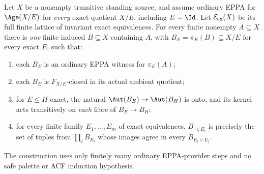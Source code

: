 \begin{theorem}
\label{thm:acf-owner-master}
Let \(X\) be a nonempty transitive standing
source, and assume ordinary EPPA for \(\Age(X/E)\) for
\emph{every} exact quotient \(X/E\), including \(E=\Id\).
Let
\(\mathcal E_{\rm ex}(X)\) be its full finite
lattice of invariant exact equivalences.
For every finite nonempty \(A\subseteq X\)
there is \emph{one} finite induced \(B\subseteq X\)
containing \(A\), with
\(B_E=\pi_E(B)\subseteq X/E\) for every exact \(E\),
such that:
\begin{enumerate}
\item[(M1)] each \(B_E\) is an ordinary EPPA
  witness for \(\pi_E(A)\);
\item[(M2)] each \(B_E\) is \(F_{X/E}\)-closed
  in its actual ambient quotient;
\item[(M3)] for \(E\le H\) exact, the natural
  \(\Aut(B_E)\to\Aut(B_H)\) is onto, and
  its kernel acts transitively on \emph{each}
  fibre of \(B_E\to B_H\);
\item[(M4)] for every finite family
  \(E_1,\ldots,E_m\) of exact equivalences,
  \(B_{\cap_iE_i}\) is precisely the set of
  tuples from \(\prod_iB_{E_i}\) whose images
  agree in every \(B_{E_i\vee E_j}\).
\end{enumerate}
The construction uses only finitely many
ordinary EPPA-provider steps and no safe
palette or ACF induction hypothesis.
\end{theorem}

